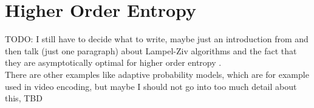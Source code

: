 \clearpage
\section{Higher Order Entropy}
TODO: I still have to decide what to write, maybe just an introduction from \cite{navarro2016compact} and then talk (just one paragraph) about Lampel-Ziv algorithms \cite{ziv1977universal} and the fact that they are asymptotically optimal for higher order entropy \cite{wyner1994sliding}. \\

\noindent There are other examples like adaptive probability models, which are for example used in video encoding, but maybe I should not go into too much detail about this, TBD
